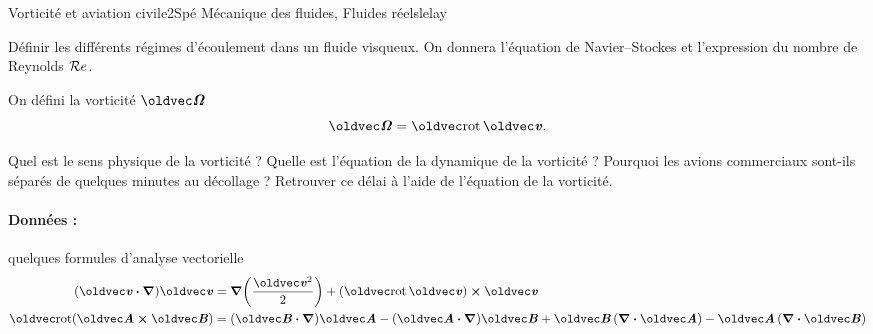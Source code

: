 
\begin{exercise}{Vorticité et aviation civile}{2}{Spé}
{Mécanique des fluides, Fluides réels}{lelay}

\begin{questions}
    \questioncours Définir les différents régimes d'écoulement dans un fluide visqueux. On donnera l'équation de Navier--Stockes et l'expression du nombre de Reynolds $\cal{R}e$.
\begin{EnvUplevel}
On défini la vorticité $\vOm$
$$\vOm = \rot\vv.$$
\end{EnvUplevel}
    \question Quel est le sens physique de la vorticité ? Quelle est l'équation de la dynamique de la vorticité ?
    \question Pourquoi les avions commerciaux sont-ils séparés de quelques minutes au décollage ? Retrouver ce délai à l'aide de l'équation de la vorticité.
\end{questions}

\paragraph{Données :} quelques formules d'analyse vectorielle
\begin{align*}
    (\vv\vdot\grad)\vv &= \grad\qty(\dfrac{\vv^2}{2}) + (\rot\vv)\cross\vv \\
    \rot(\vA\cross\vB) &= (\vB\vdot\grad)\vA - (\vA\vdot\grad)\vB + \vB\,(\div\vA) - \vA\,(\div\vB)
\end{align*}
\end{exercise}